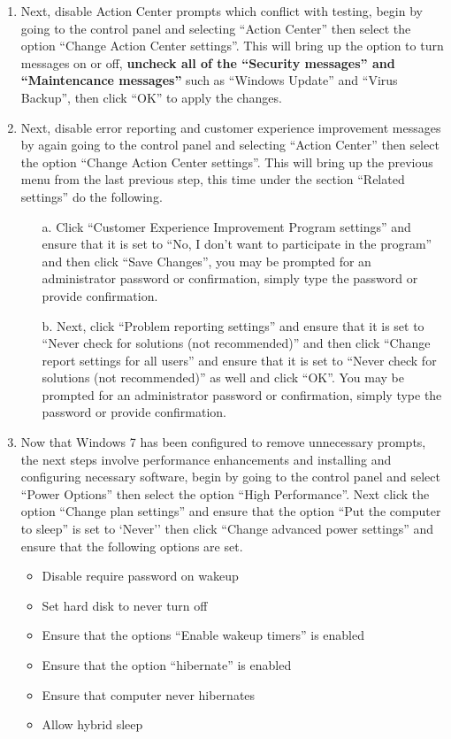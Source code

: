 \begin{enumerate}
\item	Next, disable Action Center prompts which conflict with testing, begin by going to the control panel and selecting ``Action Center''
		then select the option ``Change Action Center settings''. This will bring up the option to turn messages on or off, {\bf uncheck all of 
		the ``Security messages'' and ``Maintencance messages''} such as ``Windows Update'' and ``Virus Backup'', then click ``OK'' to apply
		the changes.
		
\item	Next, disable error reporting and customer experience improvement messages by again going to the control panel and selecting 
		``Action Center'' then select the option ``Change Action Center settings''. This will bring up the previous menu from the last
		previous step, this time under the section ``Related settings'' do the following.
\begin{itemize}	
\item[a.]	Click ``Customer Experience Improvement Program settings'' and ensure that it is set to ``No, I don't want to participate in
			the program'' and then click ``Save Changes'', you may be prompted for an administrator password or confirmation, simply type
			the password or provide confirmation.
			
\item[b.]	Next, click ``Problem reporting settings'' and ensure that it is set to ``Never check for solutions (not recommended)'' and
			then click ``Change report settings for all users'' and ensure that it is set to ``Never check for solutions (not recommended)''
			as well and click ``OK''. You may be prompted for an administrator password or confirmation, simply type the password or provide
			confirmation.
\end{itemize}	

\item	Now that Windows 7 has been configured to remove unnecessary prompts, the next steps involve performance enhancements and installing
		and configuring necessary software, begin by going to the control panel and select ``Power Options'' then select the option 
		``High Performance''. Next click the option ``Change plan settings'' and ensure that the option ``Put the computer to sleep'' is
		set to `Never'' then click ``Change advanced power settings'' and ensure that the following options are set.
\begin{itemize}
\item	Disable require password on wakeup
\item	Set hard disk to never turn off
\item	Ensure that the options ``Enable wakeup timers'' is enabled
\item	Ensure that the option ``hibernate'' is enabled
\item	Ensure that computer never hibernates
\item	Allow hybrid sleep
\end{itemize}


\end{enumerate}

